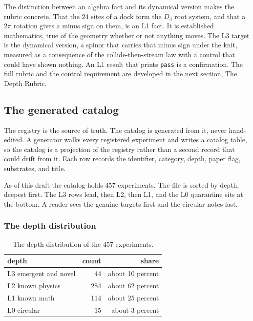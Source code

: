 The distinction between an algebra fact and its dynamical version makes the rubric concrete. That the $24$ sites of a dock form the $D_4$ root system, and that a $2\pi$ rotation gives a minus sign on them, is an L1 fact. It is established mathematics, true of the geometry whether or not anything moves. The L3 target is the dynamical version, a spinor that carries that minus sign under the knit, measured as a consequence of the collide-then-stream law with a control that could have shown nothing. An L1 result that prints \texttt{pass} is a confirmation. The full rubric and the control requirement are developed in the next section, The Depth Rubric.

\subsection{The generated catalog}

The registry is the source of truth. The catalog is generated from it, never hand-edited. A generator walks every registered experiment and writes a catalog table, so the catalog is a projection of the registry rather than a second record that could drift from it. Each row records the identifier, category, depth, paper flag, substrates, and title.

As of this draft the catalog holds $457$ experiments. The file is sorted by depth, deepest first. The L3 rows lead, then L2, then L1, and the L0 quarantine sits at the bottom. A reader sees the genuine targets first and the circular notes last.

\subsubsection{The depth distribution}

\begin{table}[ht]
\centering
\begin{tabular}{@{}lrr@{}}
\toprule
depth & count & share \\
\midrule
L3 emergent and novel & 44 & about 10 percent \\
L2 known physics & 284 & about 62 percent \\
L1 known math & 114 & about 25 percent \\
L0 circular & 15 & about 3 percent \\
\bottomrule
\end{tabular}
\caption{The depth distribution of the 457 experiments.}
\label{tab:distribution}
\end{table}

